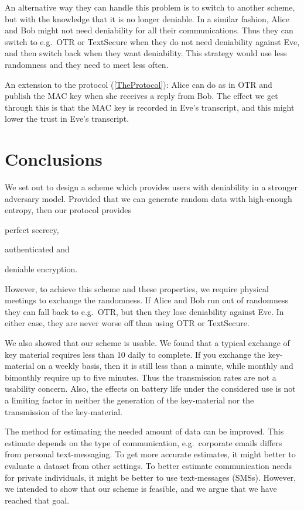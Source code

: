 An alternative way they can handle this problem is to switch to another scheme, 
but with the knowledge that it is no longer deniable.
In a similar fashion, Alice and Bob might not need deniability for all their 
communications.
Thus they can switch to e.g.~\ac{OTR} or TextSecure when they do not need 
deniability against Eve, and then switch back when they want deniability.
This strategy would use less randomness and they need to meet less often.

An extension to the protocol (\cref{TheProtocol}): Alice can do as in \ac{OTR} 
and publish the \ac{MAC} key when she receives a reply from Bob.
The effect we get through this is that the \ac{MAC} key is recorded in Eve's 
transcript, and this might lower the trust in Eve's transcript.


\section{Conclusions}
\label{Conclusions}

We set out to design a scheme which provides users with deniability in 
a stronger adversary model.
Provided that we can generate random data with high-enough entropy, then our 
protocol provides
\begin{inparablank}
  \item perfect secrecy,
  \item authenticated and
  \item deniable encryption.
\end{inparablank}
However, to achieve this scheme and these properties, we require physical 
meetings to exchange the randomness.
If Alice and Bob run out of randomness they can fall back to e.g.~\ac{OTR}, but 
then they lose deniability against Eve.
In either case, they are never worse off than using \ac{OTR} or TextSecure.

We also showed that our scheme is usable.
We found that a typical exchange of key material requires less than 
\unit{10}{\second} daily to complete.
If you exchange the key-material on a weekly basis, then it is still less than 
a minute, while monthly and bimonthly require up to five minutes.
Thus the transmission rates are not a usability concern.
Also, the effects on battery life under the considered use is not a limiting 
factor in neither the generation of the key-material nor the transmission of 
the key-material.

The method for estimating the needed amount of data can be improved.
This estimate depends on the type of communication, e.g.~corporate emails 
differs from personal text-messaging.
To get more accurate estimates, it might better to evaluate a dataset from 
other settings.
To better estimate communication needs for private individuals, it might be 
better to use text-messages (SMSs).
However, we intended to show that our scheme is feasible, and we argue that we 
have reached that goal.

